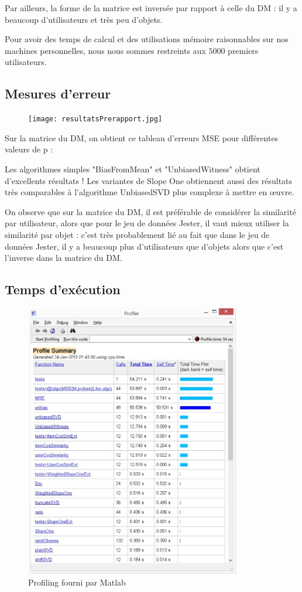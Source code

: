 \documentclass[11pt, openany, a4paper]{article}
\begin{document}
		Par ailleurs, la forme de la matrice est inversée par rapport à celle du DM : il y a beaucoup d'utilisateurs et très peu d'objets.
		
		Pour avoir des temps de calcul et des utilisations mémoire raisonnables sur nos machines personnelles, nous nous sommes restreints aux $5000$ premiers utilisateurs.
		
	\subsection{Mesures d'erreur}
	
		\begin{figure}[ht!]
			\centering
			\texttt{[image: resultatsPrerapport.jpg]}
		\end{figure}
		Sur la matrice du DM, on obtient ce tableau d'erreurs MSE pour différentes valeurs de p :
		
		
		Les algorithmes simples "BiasFromMean" et "UnbiasedWitness" obtient d'excellents résultats ! Les variantes de Slope One obtiennent aussi des résultats très comparables à l'algorithme UnbiasedSVD plus complexe à mettre en œuvre.
		
		On observe que sur la matrice du DM, il est préférable de considérer la similarité par utilisateur, alors que pour le jeu de données Jester, il vaut mieux utiliser la similarité par objet : c'est très probablement lié au fait que dans le jeu de données Jester, il y a beaucoup plus d'utilisateurs que d'objets alors que c'est l'inverse dans la matrice du DM.
	\subsection{Temps d'exécution}
	
		\begin{figure}[ht!]
			\centering
			\includegraphics[height=120mm]{times.jpg}
			\caption{Profiling fourni par Matlab}
		\end{figure}
		
\end{document}

